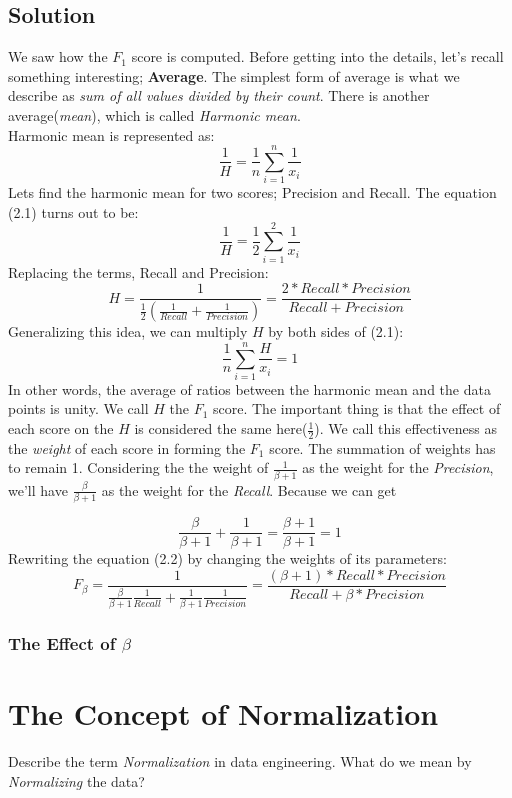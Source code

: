 \documentclass[12pt]{article}
\numberwithin{equation}{section}
\numberwithin{table}{section}
\numberwithin{figure}{section}
\begin{document}
\subsection*{Solution}
We saw how the $F_1$ score is computed. Before getting into the details, let's recall something interesting; \textbf{Average}.
The simplest form of average is what we describe as \textit{sum of all values divided by their count}. There is another average(\textit{mean}), which is called \textit{Harmonic mean}.\\
 Harmonic mean is represented as:
\begin{equation}
	\frac{1}{H}	= \frac{1}{n}\sum_{i=1}^{n}\frac{1}{x_{i}}
\end{equation}
Lets find the harmonic mean for two scores; Precision and Recall. The equation (2.1) turns out to be:
$$
	\frac{1}{H}	= \frac{1}{2}\sum_{i=1}^{2}\frac{1}{x_{i}}
$$	
Replacing the terms, Recall and Precision:
\begin{equation}
H = \frac{1}{\frac{1}{2}(\frac{1}{Recall} + \frac{1}{Precision})} =  \frac{2*Recall*Precision}{Recall + Precision}
\end{equation}
Generalizing this idea, we can multiply $H$ by both sides of (2.1):
$$
\frac{1}{n}\sum_{i=1}^{n}\frac{H}{x_i} = 1
$$
In other words, the average of ratios between the harmonic mean and the data points is unity.
We call $H$ the $F_{1}$ score. The important thing is that the effect of each score on the $H$ is considered the same here($\frac{1}{2}$). We call this effectiveness as the \textit{weight} of each score in forming the $F_{1}$ score. The summation of weights has to remain 1. Considering the the weight of $\frac{1}{\beta + 1}$ as the weight for the \textit{Precision}, we'll have $\frac{\beta}{\beta + 1}$ as the weight for the \textit{Recall}. Because we can get

$$
	\frac{\beta}{\beta + 1} + \frac{1}{\beta + 1} = \frac{\beta + 1}{\beta + 1} = 1
$$
Rewriting the equation (2.2) by changing the weights of its parameters:
\begin{equation}
	F_{\beta} = \frac{1}{\frac{\beta}{\beta + 1}\frac{1}{Recall} + \frac{1}{\beta + 1}\frac{1}{Precision}} = \frac{(\beta + 1) * Recall * Precision}{Recall + \beta*Precision}
\end{equation}
\subsubsection*{The Effect of $\beta$}

\section{The Concept of Normalization}
Describe the term \textit{Normalization} in data engineering. What do we mean by \textit{Normalizing} the data?
\end{document}
